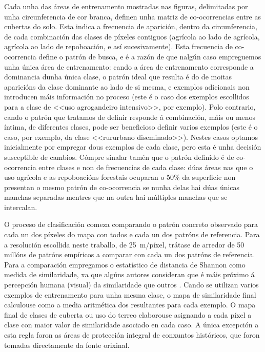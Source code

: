 \documentclass[11pt,a4paper]{article}
\begin{document}
Cada unha das áreas de entrenamento mostradas nas figuras, delimitadas por unha circunferencia de cor branca, definen unha matriz de co-ocorrencias entre as cubertas do solo. Esta indica a frecuencia de aparición, dentro da circunferencia, de cada combinación das clases de píxeles contiguos (agrícola ao lado de agrícola, agrícola ao lado de repoboación, e así sucesivamente). Esta frecuencia de co-ocorrencia define o patrón de busca, e é a razón de que nalgún caso empreguemos unha única área de entrenamento: cando a área de entrenamento corresponde a dominancia dunha única clase, o patrón ideal que resulta é do de moitas aparicións da clase dominante ao lado de si mesma, e exemplos adicionais non introducen máis información no proceso (este é o caso dos exemplos escollidos para a clase de <<uso agrogandeiro intensivo>>, por exemplo). Polo contrario, cando o patrón que tratamos de definir responde á combinación, máis ou menos íntima, de diferentes clases, pode ser beneficioso definir varios exemplos (este é o caso, por exemplo, da clase <<rururbano diseminado>>). Nestes casos optamos inicialmente por empregar dous exemplos de cada clase, pero esta é unha decisión susceptible de cambios. Cómpre sinalar tamén que o patrón definido é de co-ocorrencia entre clases e non de frecuencias de cada clase: dúas áreas nas que o uso agrícola e as repoboacións forestais ocuparan o 50\% da superficie non presentan o mesmo patrón de co-ocorrencia se nunha delas hai dúas únicas manchas separadas mentres que na outra hai múltiples manchas que se intercalan.

O proceso de clasificación comeza comparando o patrón concreto observado para cada un dos píxeles do mapa con todos e cada un dos patróns de referencia. Para a resolución escollida neste traballo, de 25~m/píxel, trátase de arredor de 50 millóns de patróns empíricos a comparar con cada un dos patróns de referencia. Para a comparación empregamos o estatístico de distancia de Shannon \citep{Cha2007} como medida de similaridade, xa que algúns autores consideran que é máis próximo á percepción humana (visual) da similaridade que outros \citep{Jasiewicz2014104}. Cando se utilizan varios exemplos de entrenamento para unha mesma clase, o mapa de similaridade final calculouse como a media aritmética dos resultantes para cada exemplo. O mapa final de clases de cuberta ou uso do terreo elaborouse asignando a cada píxel a clase con maior valor de similaridade asociado en cada caso. A única excepción a esta regla foron as áreas de protección integral de conxuntos históricos, que foron tomadas directamente da fonte orixinal.
\end{document}
